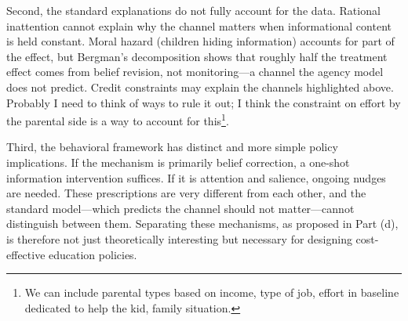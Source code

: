 \documentclass[11pt]{article}
\begin{document}
Second, the standard explanations do not fully account for the data. Rational inattention cannot explain why the channel matters when informational content is held constant. Moral hazard (children hiding information) accounts for part of the effect, but Bergman's decomposition shows that roughly half the treatment effect comes from belief revision, not monitoring---a channel the agency model does not predict. Credit constraints may explain the channels highlighted above. Probably I need to think of ways to rule it out; I think the constraint on effort by the parental side is a way to account for this\footnote{We can include parental types based on income, type of job, effort in baseline dedicated to help the kid, family situation. }.

Third, the behavioral framework has distinct and more simple policy implications. If the mechanism is primarily belief correction, a one-shot information intervention suffices. If it is attention and salience, ongoing nudges are needed. These prescriptions are very different from each other, and the standard model---which predicts the channel should not matter---cannot distinguish between them. Separating these mechanisms, as proposed in Part (d), is therefore not just theoretically interesting but necessary for designing cost-effective education policies.




\end{document}

